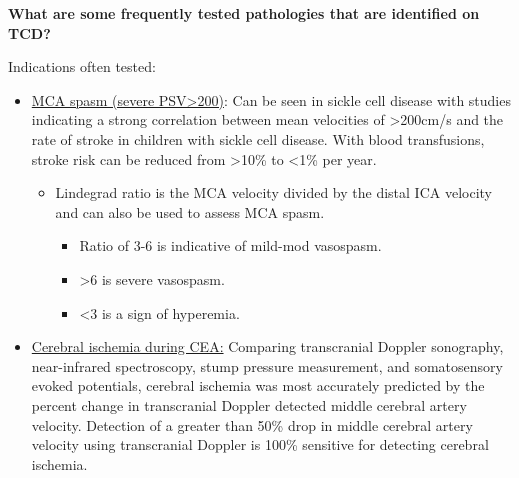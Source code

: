 \documentclass[
]{book}
\begin{document}
\textbf{What are some frequently tested pathologies that are identified on
TCD?}

Indications often tested:

\begin{itemize}
\item
  \uline{MCA spasm (severe PSV\textgreater200)}: Can be seen in sickle
  cell disease with studies indicating a strong correlation between
  mean velocities of \textgreater200cm/s and the rate of stroke in children with
  sickle cell disease. With blood transfusions, stroke risk can be
  reduced from \textgreater10\% to \textless1\% per year.
  \citep{bulasTranscranialDopplerTCD2000}

  \begin{itemize}
  \item
    Lindegrad ratio is the MCA velocity divided by the distal ICA
    velocity and can also be used to assess MCA spasm.

    \begin{itemize}
    \item
      Ratio of 3-6 is indicative of mild-mod vasospasm.
    \item
      \textgreater6 is severe vasospasm.
    \item
      \textless3 is a sign of hyperemia.\citep{kirsch2013}
    \end{itemize}
  \end{itemize}
\item
  \uline{Cerebral ischemia during CEA:} Comparing transcranial
  Doppler sonography, near-infrared spectroscopy, stump pressure
  measurement, and somatosensory evoked potentials, cerebral ischemia
  was most accurately predicted by the percent change in transcranial
  Doppler detected middle cerebral artery velocity. Detection of a
  greater than 50\% drop in middle cerebral artery velocity using
  transcranial Doppler is 100\% sensitive for detecting cerebral
  ischemia.\citep{moritzAccuracyCerebralMonitoring2007}


\end{itemize}
\end{document}
